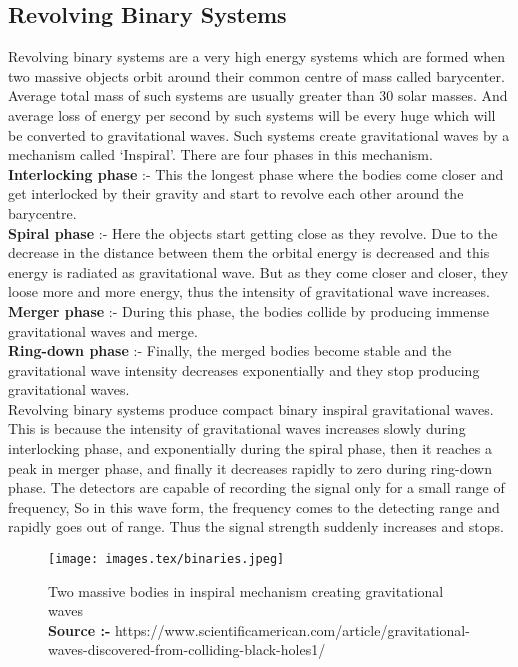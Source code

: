 \subsection{Revolving Binary Systems}

Revolving binary systems are a very high energy systems which are formed when two massive objects orbit around their common centre of mass called barycenter. Average total mass of such systems are usually greater than 30 solar masses. And average loss of energy per second by such systems will be every huge which will be converted to gravitational waves. Such systems create gravitational waves by a mechanism called `Inspiral'. There are four phases in this mechanism. \\

\textbf{Interlocking phase} :- This the longest phase where the bodies come closer and get interlocked by their gravity and start to revolve each other around the barycentre. \\

\textbf{Spiral phase} :- Here the objects start getting close as they revolve. Due to the decrease in the distance between them the orbital energy is decreased and this energy is radiated as gravitational wave. But as they come closer and closer, they loose more and more energy, thus the intensity of gravitational wave increases.\\

\textbf{Merger phase} :- During this phase, the bodies collide by producing immense gravitational waves and merge. \\

\textbf{Ring-down phase} :- Finally, the merged bodies become stable and the gravitational wave intensity decreases exponentially and they stop producing gravitational waves. \\

Revolving binary systems produce compact binary inspiral gravitational waves. This is because the intensity of gravitational waves increases slowly during interlocking phase, and exponentially during the spiral phase, then it reaches a peak in merger phase, and finally it decreases rapidly to zero during ring-down phase. The detectors are capable of recording the signal only for a small range of frequency, So in this wave form, the frequency comes to the detecting range and rapidly goes out of range. Thus the signal strength suddenly increases and stops.

\begin{figure}[h]
    \centering
    \texttt{[image: images.tex/binaries.jpeg]}
    \caption{Two massive bodies in inspiral mechanism creating gravitational waves \\
    \textbf{Source :-} https://www.scientificamerican.com/article/gravitational-waves-discovered-from-colliding-black-holes1/}
\end{figure}

